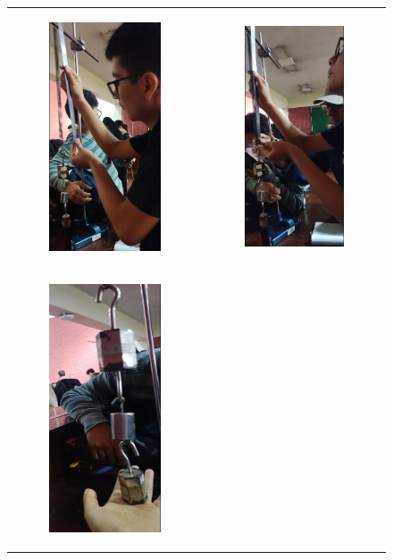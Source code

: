 \documentclass[../main.tex]{subfiles}
\begin{document}
\begin{figure}[H]
    \centering
    \begin{tabular}{c c}
        \centering
        \begin{subfigure}{0.5\linewidth}
            \centering
            \includegraphics[width=0.6\linewidth,height=0.6\linewidth]{resources/proc1.jpg}
            \label{fig:proc1}
        \end{subfigure} &
        \begin{subfigure}{0.5\linewidth}
            \centering
            \includegraphics[width=0.6\linewidth,height=0.6\linewidth]{resources/proc2.jpg}
            \label{fig:proc2}
        \end{subfigure}\\
        \begin{subfigure}{0.5\linewidth}
            \centering
            \includegraphics[width=0.6\linewidth,height=0.6\linewidth]{resources/proc3.jpg}

\end{subfigure}
\end{tabular}
\end{figure}
\end{document}
